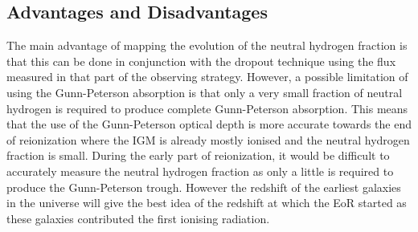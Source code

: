 	\subsection{Advantages and Disadvantages} %
	\label{sub:advantages_disadvantages}
		The main advantage of mapping the evolution of the neutral hydrogen fraction is that this can be done in conjunction with the dropout technique using the flux measured in that part of the observing strategy. However, a possible limitation of using the Gunn-Peterson absorption is that only a very small fraction of neutral hydrogen is required to produce complete Gunn-Peterson absorption. This means that the use of the Gunn-Peterson optical depth is more accurate towards the end of reionization where the IGM is already mostly ionised and the neutral hydrogen fraction is small. During the early part of reionization, it would be difficult to accurately measure the neutral hydrogen fraction as only a little is required to produce the Gunn-Peterson trough. However the redshift of the earliest galaxies in the universe will give the best idea of the redshift at which the EoR started as these galaxies contributed the first ionising radiation.
